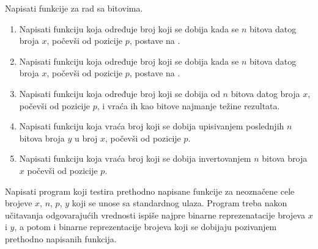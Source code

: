 \begin{Exercise}[label=204]
Napisati funkcije za rad sa bitovima. 
\begin{enumerate}
\item Napisati funkciju  koja određuje broj koji se dobija kada se $n$ bitova datog broja $x$, počevši od pozicije $p$, postave na .
\item Napisati funkciju  koja određuje broj koji se dobija kada se $n$ bitova datog broja $x$, počevši od pozicije $p$, postave na .
\item Napisati funkciju  koja određuje broj koji se dobija od $n$ bitova datog broja $x$, počevši od pozicije $p$, i vraća ih kao bitove najmanje težine rezultata.
\item Napisati funkciju  koja vraća broj koji se dobija upisivanjem poslednjih $n$ bitova broja $y$ u broj $x$, počevši od pozicije $p$.
\item Napisati funkciju  koja vraća broj koji se dobija invertovanjem $n$ bitova broja $x$ počevši od pozicije $p$. 
\end{enumerate}
Napisati program koji testira prethodno napisane funkcije za neoznačene cele brojeve $x$, $n$, $p$, $y$ koji se unose sa standardnog ulaza. Program treba nakon učitavanja odgovarajućih vrednosti ispiše najpre binarne reprezenatacije brojeva $x$ i $y$, a potom i binarne reprezentacije brojeva koji se dobijaju pozivanjem prethodno napisanih funkcija.


\end{Exercise}
